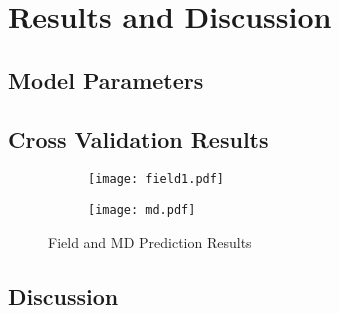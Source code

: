 \chapter{Results and Discussion}

\section{Model Parameters}

\section{Cross Validation Results}

\begin{figure}[p]
	\centering
	\begin{subfigure}[b]{\textwidth}
		\centering
		\texttt{[image: field1.pdf]}
		\caption{}
	\end{subfigure}
	\hfill
	\begin{subfigure}[b]{\textwidth}
		\centering
		\texttt{[image: md.pdf]}
		\caption{}
	\end{subfigure}
	\caption[Field and \acs{MD} Prediction Results]{Field and \ac{MD} Prediction Results}
\end{figure}

\section{Discussion}



